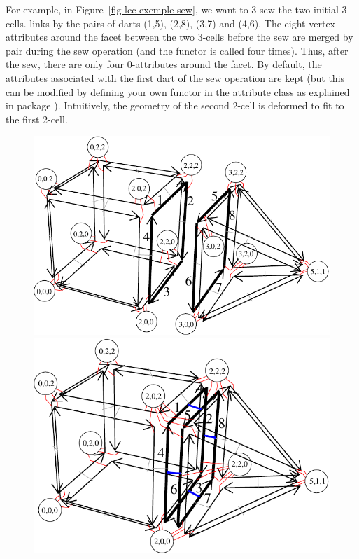 For example, in Figure~\ref{fig-lcc-exemple-sew}, we want to 3-sew the
two initial 3-cells.  links by \betatrois{} the pairs
of darts (1,5), (2,8), (3,7) and (4,6). The eight vertex attributes
around the facet between the two 3-cells before the sew are merged by
pair during the sew operation (and the  functor is
called four times). Thus, after the sew, there are only four
0-attributes around the facet. By default, the attributes associated
with the first dart of the sew operation are kept (but this can be
modified by defining your own functor in the attribute class as
explained in package ). 
Intuitively, the
geometry of the second 2-cell is deformed to fit to the first 2-cell.
%
\def\LargFig{.45\textwidth}
\begin{figure}
  \begin{ccTexOnly}
    \begin{center}
      \includegraphics[width=\LargFig]{Linear_cell_complex/fig/pdf/exemple-carte-with_point_3d-sew}\qquad
      \includegraphics[width=\LargFig]{Linear_cell_complex/fig/pdf/exemple-carte-with_point_3d-sew2}

\end{center}
\end{ccTexOnly}
\end{figure}
